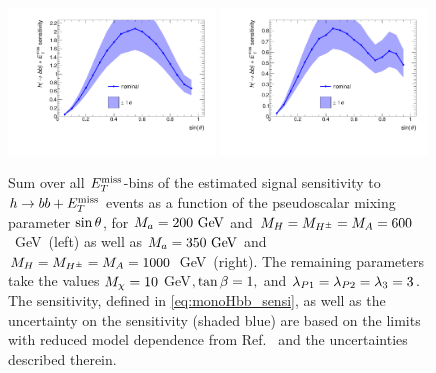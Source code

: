 \begin{figure}[tbp]
\centering
\includegraphics[width=0.49\textwidth]{texinputs/04_grid/figures/monoHbb_sinp_scan_1_sensi_1D.pdf}
\includegraphics[width=0.49\textwidth]{texinputs/04_grid/figures/monoHbb_sinp_scan_2_sensi_1D.pdf}
\caption[Sensitivity to $h\to bb + \MET$ signals with different $\sinp$, summed across $\MET$ bins]
{
Sum over all $\MET$-bins of the estimated signal sensitivity to $h\to bb + \MET$ events as a function of the pseudoscalar mixing parameter $\sinp$, for $M_{a} = 200~\textrm{GeV}$ and $M_{H}=M_{H^{\pm}}=M_{A} = 600$~GeV~(left) as well as $M_{a} = 350~\textrm{GeV}$ and $M_{H}=M_{H^{\pm}}=M_{A} = 1000$~GeV~(right). The remaining parameters take the values
$M_{\chi} = 10 $ GeV$, \tan\beta = 1,$ and $ \lambda_{P1} = \lambda_{P2} = \lambda_{3} = 3 $.
The sensitivity, defined in \autoref{eq:monoHbb_sensi}, as well as the uncertainty on the sensitivity (shaded blue) 
 are based on the limits with reduced model dependence from Ref.~\cite{Aaboud:2017yqz} and the uncertainties described therein. 
}
\label{fig:monoHbb_sensi_full_sinp}
\end{figure}



